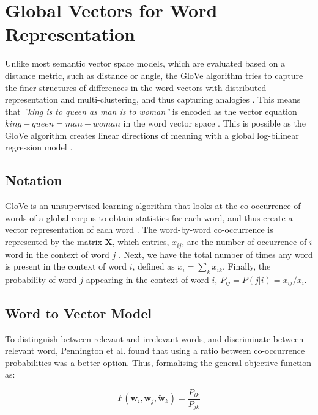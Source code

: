 

\section{Global Vectors for Word Representation}
Unlike most semantic vector space models, which are evaluated based on a distance metric, such as distance or angle, the GloVe algorithm tries to capture the finer structures of differences in the word vectors with distributed representation and multi-clustering, and thus capturing analogies \cite{pennington2014glove}. This means that \textit{''king is to queen as man is to woman''} is encoded as the vector equation $king - queen = man - woman$ in the word vector space \cite{pennington2014glove}. This is possible as the GloVe algorithm creates linear directions of meaning with a global log-bilinear regression model \cite{pennington2014glove}.


\label{sec:GloVe}
\subsection{Notation}
\label{sec:notation}
GloVe is an unsupervised learning algorithm that looks at the co-occurrence of words of a global corpus to obtain statistics for each word, and thus create a vector representation of each word \cite{pennington2014glove}. The word-by-word co-occurrence is represented by the matrix $\boldsymbol{X}$, which entries, $x_{ij}$, are the number of occurrence of $i$ word in the context of word $j$ \cite{pennington2014glove}. Next, we have the total number of times any word is present in the context of word $i$, defined as $x_i = \sum_k x_{ik}$. Finally, the probability of word $j$ appearing in the context of word $i$, $P_{ij} = P(j|i)= x_{ij} / x_{i}$.

\subsection{Word to Vector Model}
\label{sec:wordvec}
To distinguish between relevant and irrelevant words, and discriminate between relevant word, Pennington et al. \cite{pennington2014glove} found that using a ratio between co-occurrence probabilities was a better option. Thus, formalising the general objective function as:


\begin{equation}
    F(\boldsymbol{w}_i, \boldsymbol{w}_j, \boldsymbol{\tilde{w}}_k) = \frac{P_{ik}}{P_{jk}}
    \label{eq:objective}
\end{equation}


